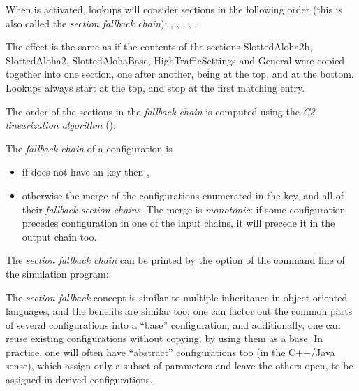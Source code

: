When  is activated, lookups will consider sections in the
following order (this is also called the \textit{section fallback chain}):
, , ,
, .

The effect is the same as if the contents of the sections
SlottedAloha2b, SlottedAloha2, SlottedAlohaBase, HighTrafficSettings and
General were copied together into one section, one after another,
 being at the top, and \ttt{[General]}
at the bottom. Lookups always start at the top, and stop at the first
matching entry.

The order of the sections in the \textit{fallback chain} is computed
using the \textit{C3 linearization algorithm} (\cite{Barrett1996}):

The \textit{fallback chain} of a configuration  is
\begin{itemize}
  \item if  does not have an  key then
        , 
  \item otherwise the merge of the configurations enumerated in the
         key, and all of their \textit{fallback section chains}.
        The merge is \textit{monotonic}: if some configuration 
        precedes configuration  in one of the input chains,
        it will precede it in the output chain too.
\end{itemize}

The \textit{section fallback chain} can be printed by the  option
of the command line of the simulation program:


The \textit{section fallback} concept is similar to multiple inheritance in
object-oriented languages, and the benefits are similar too; one can factor out
the common parts of several configurations into a ``base'' configuration,
and additionally, one can reuse existing configurations without copying, by
using them as a base. In practice, one will often have ``abstract''
configurations too (in the C++/Java sense), which assign only a subset of
parameters and leave the others open, to be assigned in derived
configurations.

